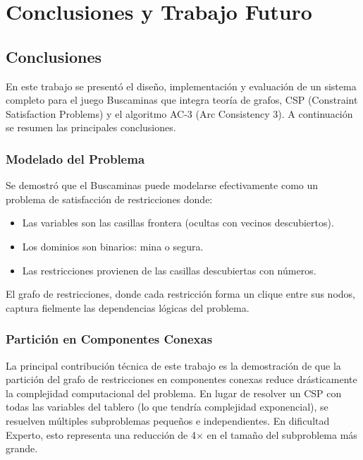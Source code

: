 \documentclass[12pt,a4paper]{article}
\begin{document}
\section{Conclusiones y Trabajo Futuro}

\subsection{Conclusiones}

En este trabajo se presentó el diseño, implementación y evaluación de un sistema completo para el juego Buscaminas que integra teoría de grafos, CSP (Constraint Satisfaction Problems) y el algoritmo AC-3 (Arc Consistency 3). A continuación se resumen las principales conclusiones.

\subsubsection{Modelado del Problema}

Se demostró que el Buscaminas puede modelarse efectivamente como un problema de satisfacción de restricciones donde:
\begin{itemize}[itemsep=2pt]
    \item Las variables son las casillas frontera (ocultas con vecinos descubiertos).
    \item Los dominios son binarios: mina o segura.
    \item Las restricciones provienen de las casillas descubiertas con números.
\end{itemize}

El grafo de restricciones, donde cada restricción forma un clique entre sus nodos, captura fielmente las dependencias lógicas del problema.

\subsubsection{Partición en Componentes Conexas}

La principal contribución técnica de este trabajo es la demostración de que la partición del grafo de restricciones en componentes conexas reduce drásticamente la complejidad computacional del problema. En lugar de resolver un CSP con todas las variables del tablero (lo que tendría complejidad exponencial), se resuelven múltiples subproblemas pequeños e independientes. En dificultad Experto, esto representa una reducción de 4$\times$ en el tamaño del subproblema más grande.
\end{document}
